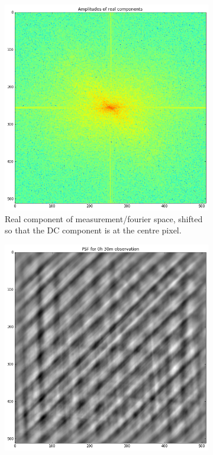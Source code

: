 \begin{figure}[ht!]
\begin{mdframed}
\begin{subfigure}[b]{0.39\textwidth}
  \includegraphics[width=\textwidth]{images/evla_lena_observation/real_FT.png}
  \caption{Real component of measurement/fourier space, shifted so that the DC component is at the centre pixel.}
 \end{subfigure}
 \begin{subfigure}[b]{0.34\textwidth}
  \includegraphics[width=\textwidth]{images/evla_lena_observation/30min.png}

\end{subfigure}
\end{mdframed}
\end{figure}
